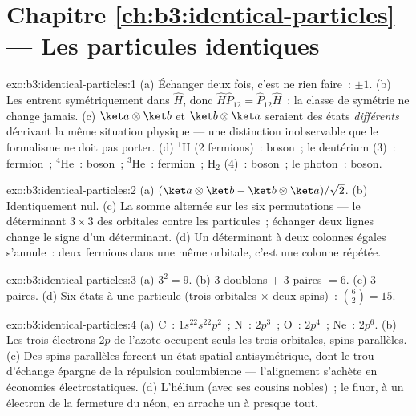 \section*{Chapitre \ref{ch:b3:identical-particles} --- Les particules identiques}

\begin{solution}{exo:b3:identical-particles:1}
(a) Échanger deux fois, c'est ne rien faire~:  $\pm1$.
(b) Les  entrent symétriquement dans $\hat H$,
donc $\hat H\hat
P_{12} = \hat P_{12}\hat H$~: la classe de symétrie ne change jamais.
(c) $\ket a\otimes\ket b$ et $\ket b\otimes\ket a$ seraient des états
\emph{différents} décrivant la même situation physique --- une
distinction inobservable que le formalisme ne doit pas porter. (d)
$^1$H (2 fermions)~: boson~; le deutérium (3)~: fermion~; $^4$He~:
boson~; $^3$He~: fermion~; H$_2$ (4)~: boson~; le photon~: boson.
\end{solution}

\begin{solution}{exo:b3:identical-particles:2}
(a) $(\ket a\otimes\ket b - \ket b\otimes\ket a)/\sqrt2$. (b)
Identiquement nul. (c) La somme alternée sur les six permutations ---
le déterminant $3\times3$ des orbitales contre les particules~;
échanger deux lignes change le signe d'un déterminant. (d) Un
déterminant à deux colonnes égales s'annule~: deux fermions dans une
même orbitale, c'est une colonne répétée.
\end{solution}

\begin{solution}{exo:b3:identical-particles:3}
(a) $3^2 = 9$. (b) $3$ doublons $+$ $3$ paires $= 6$. (c) $3$ paires.
(d) Six états à une particule (trois orbitales $\times$ deux spins)~:
$\binom62 = 15$.
\end{solution}

\begin{solution}{exo:b3:identical-particles:4}
(a) C~: $1s^22s^22p^2$~; N~: $2p^3$~; O~: $2p^4$~; Ne~: $2p^6$. (b)
Les trois électrons $2p$ de l'azote occupent seuls les trois
orbitales, spins parallèles. (c) Des spins parallèles forcent un état
spatial antisymétrique, dont le trou d'échange épargne de la répulsion
coulombienne --- l'alignement s'achète en économies électrostatiques.
(d) L'hélium (avec ses cousins nobles)~; le fluor, à un électron de la
fermeture du néon, en arrache un à presque tout.
\end{solution}

